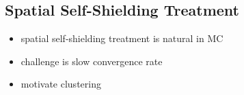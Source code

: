 \subsection{Spatial Self-Shielding Treatment}
\label{subsec:chap2-spatial-shield}

\begin{itemize}
  \item spatial self-shielding treatment is natural in \ac{MC}
  \item challenge is slow convergence rate
  \item motivate clustering
\end{itemize}